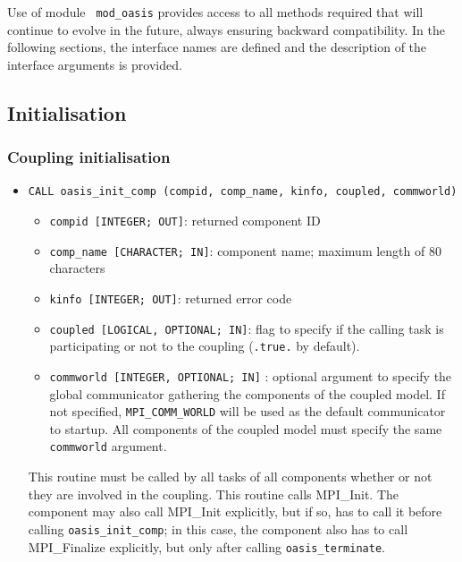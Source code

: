 Use of module {\tt
  mod\_oasis} provides access to all methods required
that will continue to evolve in the future, always
ensuring backward compatibility.  In the following sections, the
interface names are defined and
the description of the interface arguments is provided.

\subsection{Initialisation}
\label{subsubsec_Initialisation}

\subsubsection{Coupling initialisation}
\label{init_comp}

\begin{itemize}

\item {\tt CALL oasis\_init\_comp (compid, comp\_name, kinfo, coupled, commworld)}

  \begin{itemize}
  \item {\tt compid [INTEGER; OUT]}: returned component ID
  \item {\tt comp\_name [CHARACTER; IN]}: component name; maximum length of 80 characters
  \item {\tt kinfo [INTEGER; OUT]}: returned error code
  \item {\tt coupled [LOGICAL, OPTIONAL; IN]}: flag to specify if the calling task is participating or not to the coupling ({\tt .true.} by default).
  \item {\tt commworld [INTEGER, OPTIONAL; IN]} : optional argument to specify the global communicator gathering the components of the coupled model.
  If not specified, {\tt MPI\_COMM\_WORLD} will be used as the default communicator to startup. All components of the coupled model must
  specify the same {\tt commworld} argument.

  \end{itemize}

  This routine must be called by all tasks of all components whether or not they are involved in the coupling. This routine calls MPI\_Init. The component may also call MPI\_Init explicitly, but if so, has to call it before calling {\tt oasis\_init\_comp}; in this case, the component also has to call MPI\_Finalize explicitly, but only after calling {\tt oasis\_terminate}.


\end{itemize}
